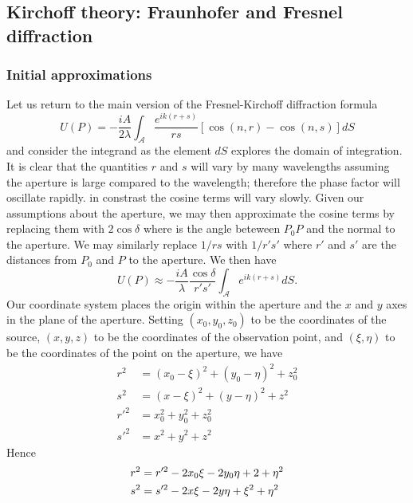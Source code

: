 \documentclass[../../main.tex]{subfiles} %
\begin{document}
\subsection{Kirchoff theory: Fraunhofer and Fresnel diffraction}
\subsubsection{Initial approximations}
Let us return to the main version of the Fresnel-Kirchoff diffraction formula
\begin{equation} \label{eq. Kirchhoff integral theorem 2 again}
    U(P)=-\frac{iA}{2\lambda}\int_{\mathcal{A}}\frac{e^{ik(r+s)}}{rs}[\cos(n,r)-\cos(n,s)]dS
\end{equation}
and consider the integrand as the element $dS$ explores the domain of integration. It is clear that the quantities $r$ and $s$ will vary by many wavelengths assuming the aperture is large compared to the wavelength; therefore the phase factor will oscillate rapidly. in constrast the cosine terms will vary slowly. Given our assumptions about the aperture, we may then approximate the cosine terms by replacing them with $2\cos\delta$ where is the angle beteween $P_0P$ and the normal to the aperture. We may similarly replace $1/rs$ with $1/r's'$ where $r'$ and $s'$ are the distances from $P_0$ and $P$ to the aperture. We then have
\begin{equation} \label{eq. Kirchhoff integral 4}
    U(P)\approx-\frac{iA}{\lambda}\frac{\cos\delta}{r's'}\int_{\mathcal{A}}e^{ik(r+s)}dS.
\end{equation}
Our coordinate system places the origin within the aperture and the $x$ and $y$ axes in the plane of the aperture. Setting $(x_0,y_0,z_0)$ to be the coordinates of the source, $(x,y,z)$ to be the coordinates of the observation point, and $(\xi,\eta)$ to be the coordinates of the point on the aperture, we have
\begin{equation} \label{eq. Fresnel coordinates}
    \begin{aligned}
    r^2&=(x_0-\xi)^2+(y_0-\eta)^2+z_0^2\\
    s^2&=(x-\xi)^2+(y-\eta)^2+z^2\\
    r'^2&=x_0^2+y_0^2+z_0^2\\
    s'^2&=x^2+y^2+z^2
    \end{aligned}
\end{equation}
Hence
\begin{equation} \label{eq. Fresnel coordinate transformation}
    \begin{aligned}
    r^2&=r'^2-2x_0\xi-2y_0\eta+\si^2+\eta^2\\
    s^2&=s'^2-2x\xi-2y\eta +\xi^2+\eta^2
    \end{aligned}
\end{equation}
\end{document}
